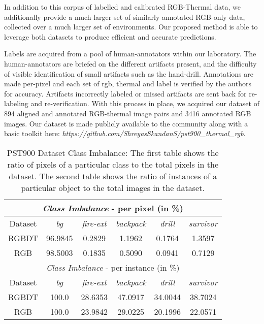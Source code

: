 \documentclass[letterpaper, 10 pt, conference]{ieeeconf}
\begin{document}
In addition to this corpus of labelled and calibrated RGB-Thermal data, we additionally provide a much larger set of similarly annotated RGB-only data, collected over a much larger set of environments. Our proposed method is able to leverage both datasets to produce efficient and accurate predictions.

Labels are acquired from a pool of human-annotators within our laboratory. The human-annotators are briefed on the different artifacts present, and the difficulty of visible identification of small artifacts such as the hand-drill. Annotations are made per-pixel and each set of {rgb, thermal and label} is verified by the authors for accuracy. Artifacts incorrectly labeled or missed artifacts are sent back for re-labeling and re-verification. With this process in place, we acquired our dataset of 894 aligned and annotated RGB-thermal image pairs and 3416 annotated RGB images. Our dataset is made publicly available to the community along with a basic toolkit here: \emph{https://github.com/ShreyasSkandanS/pst900\_thermal\_rgb}. 

\begin{table}
\centering
\caption{PST900 Dataset Class Imbalance: The first table shows the ratio of pixels of a particular class to the total pixels in the dataset. The second table shows the ratio of instances of a particular object to the total images in the dataset.}
\begin{tabular}{|c|c|c|c|c|c|}
\hline
\multicolumn{6}{|c|}{\textit{Class Imbalance} - per pixel (in \%)}\\
\hline
Dataset & \textit{bg} & \textit{fire-ext} & \textit{backpack} & \textit{drill} & \textit{survivor} \\
\hline
RGBDT & 96.9845 & 0.2829 & 1.1962 & 0.1764 & 1.3597 \\
RGB & 98.5003 & 0.1835 & 0.5090 & 0.0941 & 0.7129  \\
\hline
\multicolumn{6}{|c|}{\textit{Class Imbalance} - per instance (in \%)}\\
\hline
Dataset & \textit{bg} & \textit{fire-ext} & \textit{backpack} & \textit{drill} & \textit{survivor} \\
\hline
RGBDT & 100.0 & 28.6353 & 47.0917 & 34.0044 & 38.7024 \\
RGB & 100.0 & 23.9842 & 29.0225 & 20.1996 & 22.0571 \\
\hline
\end{tabular}
\label{tab:class_balance}
\vspace{-0.45cm}
\end{table}
\end{document}
